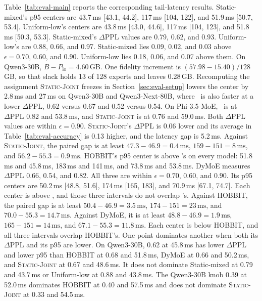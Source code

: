 Table~\ref{tab:eval-main} reports the corresponding tail-latency results. Static-mixed's p95 centers are 43.7\,ms [43.1, 44.2], 117\,ms [104, 122], and 51.9\,ms [50.7, 53.4]. Uniform-low's centers are 43.8\,ms [43.0, 44.6], 117\,ms [104, 123], and 51.8\,ms [50.3, 53.3]. Static-mixed's \(\Delta\mathrm{PPL}\) values are 0.79, 0.62, and 0.93. Uniform-low's are 0.88, 0.66, and 0.97. Static-mixed lies 0.09, 0.02, and 0.03 above \(\epsilon=0.70\), \(0.60\), and \(0.90\). Uniform-low lies 0.18, 0.06, and 0.07 above them. On Qwen3-30B, \(B-P_{\mathrm{lo}}=4.60\)\,GB. One fidelity increment is \((57.98-15.40)/128\)\,GB, so that slack holds 13 of 128 experts and leaves 0.28\,GB. Recomputing the assignment \textsc{Static-Joint} freezes in Section~\ref{sec:eval-setup} lowers the center by 2.8\,ms and 27\,ms on Qwen3-30B and Qwen3-Next-80B, where \systemname\ is also faster at a lower \(\Delta\mathrm{PPL}\), 0.62 versus 0.67 and 0.52 versus 0.54. On Phi-3.5-MoE, \systemname\ is at \(\Delta\mathrm{PPL}\) 0.82 and 53.8\,ms, and \textsc{Static-Joint} is at 0.76 and 59.0\,ms. Both \(\Delta\mathrm{PPL}\) values are within \(\epsilon=0.90\). \textsc{Static-Joint}'s \(\Delta\mathrm{PPL}\) is 0.06 lower and its average in Table~\ref{tab:eval-accuracy} is 0.13 higher, and the latency gap is 5.2\,ms. Against \textsc{Static-Joint}, the paired gap is at least \(47.3-46.9=0.4\,\mathrm{ms}\), \(159-151=8\,\mathrm{ms}\), and \(56.2-55.3=0.9\,\mathrm{ms}\). HOBBIT's p95 center is above \systemname's on every model: 51.8\,ms and 45.8\,ms, 183\,ms and 141\,ms, and 73.8\,ms and 53.8\,ms. DyMoE measures \(\Delta\mathrm{PPL}\) 0.66, 0.54, and 0.82. All three are within \(\epsilon=0.70\), \(0.60\), and \(0.90\). Its p95 centers are 50.2\,ms [48.8, 51.6], 174\,ms [165, 183], and 70.9\,ms [67.1, 74.7]. Each center is above \systemname, and those three intervals do not overlap \systemname's. Against HOBBIT, the paired gap is at least \(50.4-46.9=3.5\,\mathrm{ms}\), \(174-151=23\,\mathrm{ms}\), and \(70.0-55.3=14.7\,\mathrm{ms}\). Against DyMoE, it is at least \(48.8-46.9=1.9\,\mathrm{ms}\), \(165-151=14\,\mathrm{ms}\), and \(67.1-55.3=11.8\,\mathrm{ms}\). Each center is below HOBBIT, and all three intervals overlap HOBBIT's.
One point dominates another when both its \(\Delta\mathrm{PPL}\) and its p95 are lower.
On Qwen3-30B, 0.62 at 45.8\,ms has lower \(\Delta\mathrm{PPL}\) and lower p95 than HOBBIT at 0.68 and 51.8\,ms, DyMoE at 0.66 and 50.2\,ms, and \textsc{Static-Joint} at 0.67 and 48.6\,ms. It does not dominate Static-mixed at 0.79 and 43.7\,ms or Uniform-low at 0.88 and 43.8\,ms.
The Qwen3-30B knob 0.39 at 52.0\,ms dominates HOBBIT at 0.40 and 57.5\,ms and does not dominate \textsc{Static-Joint} at 0.33 and 54.5\,ms.
